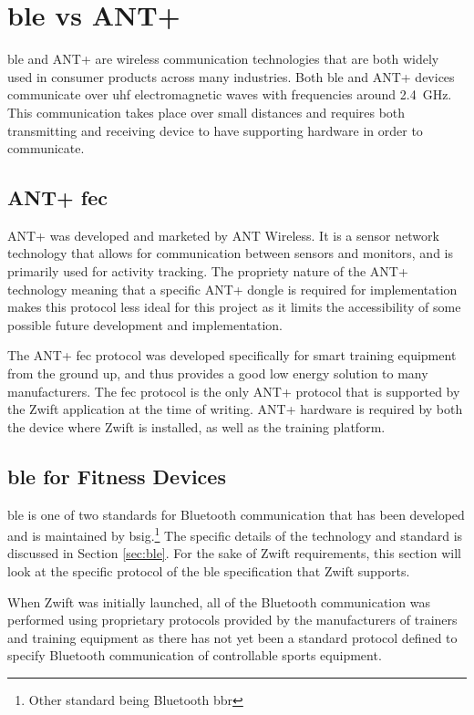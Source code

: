 \section{\ac{ble} vs ANT+}
\label{sec:ant}

\ac{ble} and ANT+ are wireless communication technologies that are both widely used in consumer products across many industries. Both \ac{ble} and ANT+ devices communicate over \ac{uhf} electromagnetic waves with frequencies around \SI{2.4}{\giga\hertz}. This communication takes place over small distances and requires both transmitting and receiving device to have supporting hardware in order to communicate.

\subsection{ANT+ \acl{fec}}

ANT+ was developed and marketed by ANT Wireless. It is a sensor network technology that allows for communication between sensors and monitors, and is primarily used for activity tracking. The propriety nature of the ANT+ technology meaning that a specific ANT+ dongle is required for implementation makes this protocol less ideal for this project as it limits the accessibility of some possible future development and implementation.

The ANT+ \ac{fec} protocol was developed specifically for smart training equipment from the ground up, and thus provides a good low energy solution to many manufacturers. The \ac{fec} protocol is the only ANT+ protocol that is supported by the Zwift application at the time of writing. ANT+ hardware is required by both the device where Zwift is installed, as well as the training platform.

\subsection{\ac{ble} for Fitness Devices}
\ac{ble} is one of two standards for Bluetooth communication that has been developed and is maintained by \ac{bsig}.\footnote{Other standard being Bluetooth \ac{bbr}} The specific details of the technology and standard is discussed in Section \ref{sec:ble}. For the sake of Zwift requirements, this section will look at the specific protocol of the \ac{ble} specification that Zwift supports.

When Zwift was initially launched, all of the Bluetooth communication was performed using proprietary protocols provided by the manufacturers of trainers and training equipment as there has not yet been a standard protocol defined to specify Bluetooth communication of controllable sports equipment.

